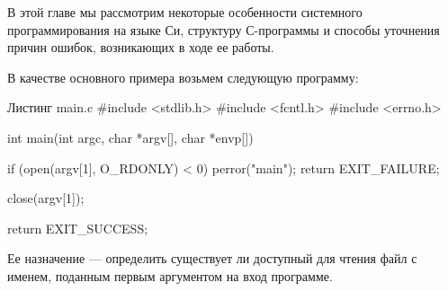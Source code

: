 В этой главе мы рассмотрим некоторые особенности системного программирования на языке Си, структуру С-программы и способы уточнения причин ошибок, возникающих в ходе ее работы.

В качестве основного примера возьмем следующую программу:

\begin{CCode}{Листинг main.c}
			#include <stdlib.h>
			#include <fcntl.h>
			#include <errno.h>			
		
			int main(int argc, char *argv[], char *envp[]) { 
				
				if (open(argv[1], O_RDONLY) < 0) {
					perror("main");			
					return EXIT_FAILURE;
				}	 
				
 				close(argv[1]);
 				
 				return EXIT_SUCCESS;
			} 
\end{CCode}

Ее назначение --- определить существует ли доступный для чтения файл с именем, поданным первым аргументом на вход программе.